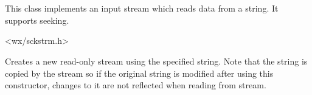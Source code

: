 
\section{}\label{wxstringinputstream}

This class implements an input stream which reads data from a string. It
supports seeking.




<wx/sckstrm.h>





Creates a new read-only stream using the specified string. Note that the string
is copied by the stream so if the original string is modified after using this
constructor, changes to it are not reflected when reading from stream. 

